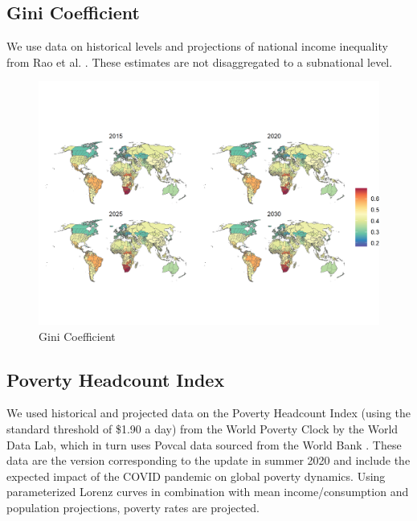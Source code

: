 \documentclass{article}
\begin{document}
\pagebreak
\subsection{Gini Coefficient}
We use data on historical levels and projections of national income inequality from Rao et al. \citep{Rao2019a}.  These estimates are not disaggregated to a subnational level.

\begin{figure}[H]
  \centering
  \includegraphics[width=\linewidth]{img/covars/gini.png}
  \caption{Gini Coefficient}
\end{figure}

\pagebreak
\subsection{Poverty Headcount Index}
We used historical and projected data on the Poverty Headcount Index (using the standard threshold of \$1.90 a day) from the World Poverty Clock by the World Data Lab, which in turn uses Povcal data sourced from the World Bank \citep{Cuaresma2018}. These data are the version corresponding to the update in summer 2020 and include the expected impact of the COVID pandemic on global poverty dynamics. Using parameterized Lorenz curves in combination with mean income/consumption and population projections, poverty rates are projected. 
\end{document}
